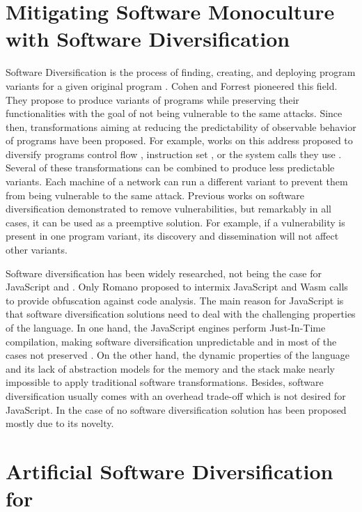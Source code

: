 \section{Mitigating Software Monoculture with Software Diversification}

Software Diversification is the process of finding, creating, and deploying program variants for a given original program \cite{okhravi2013survey}.
Cohen \etal \cite{cohen1993operating} and Forrest \etal \cite{595185} pioneered this field. 
They propose to produce variants of programs while preserving their functionalities with the goal of not being vulnerable to the same attacks.
Since then, transformations aiming at reducing the predictability of observable behavior of programs have been proposed. For example, works on this address proposed to diversify programs control flow \citationneeded, instruction set \citationneeded, or the system calls they use \citationneeded. 
Several of these transformations can be combined to produce less predictable variants.
Each machine of a network can run a different variant to prevent them from being
vulnerable to the same attack.
Previous works on software diversification demonstrated to remove vulnerabilities, but remarkably in all cases, it can be used as a preemptive solution.
For example, if a vulnerability is present in one program variant, its discovery and dissemination will not affect other variants.


Software diversification has been widely researched, not being the case for JavaScript and \wasm.
Only Romano \etal \cite{wobfuscator} proposed to intermix JavaScript and Wasm calls to provide obfuscation against code analysis. 
The main reason for JavaScript is that software diversification solutions need to deal with the challenging properties of the language.
In one hand, the JavaScript engines perform Just-In-Time compilation, making software diversification unpredictable and in most of the cases not preserved \cite{STRAC}.
On the other hand, the dynamic properties of the language and its lack of abstraction models for the memory and the stack make nearly impossible to apply traditional software transformations.
Besides, software diversification usually comes with an overhead trade-off which is not desired for JavaScript. 
In the case of \wasm no software diversification solution has been proposed mostly due to its novelty.



\section{Artificial Software Diversification for \wasm}

